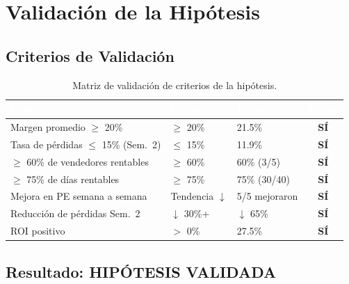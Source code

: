 \documentclass[12pt,letterpaper]{article}
\begin{document}
\newpage
\section{Validación de la Hipótesis}

\subsection{Criterios de Validación}

\begin{table}[H]
\centering
\footnotesize
{}
\begin{tabular}{p{4cm} p{2.5cm} p{3cm} c}
\toprule
\rowcolor{tabheader}
\textcolor{white}{\textbf{Criterio}} &
\textcolor{white}{\textbf{Umbral}} &
\textcolor{white}{\textbf{Resultado}} &
\textcolor{white}{\textbf{Válido}} \\
\midrule
Margen promedio $\geq$ 20\% & $\geq$ 20\% & 21.5\% & \textcolor{success}{\textbf{SÍ}} \\
Tasa de pérdidas $\leq$ 15\% (Sem.~2) & $\leq$ 15\% & 11.9\% & \textcolor{success}{\textbf{SÍ}} \\
$\geq$ 60\% de vendedores rentables & $\geq$ 60\% & 60\% (3/5) & \textcolor{success}{\textbf{SÍ}} \\
$\geq$ 75\% de días rentables & $\geq$ 75\% & 75\% (30/40) & \textcolor{success}{\textbf{SÍ}} \\
Mejora en PE semana a semana & Tendencia $\downarrow$ & 5/5 mejoraron & \textcolor{success}{\textbf{SÍ}} \\
Reducción de pérdidas Sem.~2 & $\downarrow$ 30\%+ & $\downarrow$ 65\% & \textcolor{success}{\textbf{SÍ}} \\
ROI positivo & $>$ 0\% & 27.5\% & \textcolor{success}{\textbf{SÍ}} \\
\bottomrule
\end{tabular}
\caption{Matriz de validación de criterios de la hipótesis.}
\end{table}

\subsection{Resultado: HIPÓTESIS VALIDADA}

\begin{center}
\end{center}
\end{document}
